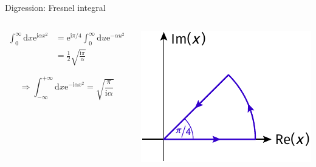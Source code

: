 \documentclass[t,dvipsnames]{beamer}
\begin{document}
\begin{frame}[c]{Digression: Fresnel integral}
 \begin{columns}
  \begin{column}[b]{0.5\textwidth}
   \begin{displaymath}
    \begin{aligned}
     \int_0^\infty\text{d}x\text{e}^{\text{i}\alpha x^2}
          &= \text{e}^{\text{i}\pi/4}\!\int_0^\infty\!\text{d}u\text{e}^{-\alpha u^2}\\
          &= \frac{1}{2}\sqrt{\frac{\text{i}\pi}{\alpha}}
    \end{aligned}
   \end{displaymath}

   \begin{displaymath}
    \Rightarrow\int_{-\infty}^{+\infty}\text{d}x\text{e}^{-\text{i}\alpha x^2}
          = \sqrt{\frac{\pi}{\text{i}\alpha}}
   \end{displaymath}

  \end{column}%
  \begin{column}[b]{0.5\textwidth}
   \includegraphics[width=\textwidth]{fresnel}

   \vspace{-0.4truecm}
  \end{column}
 \end{columns}
\end{frame}
\end{document}
